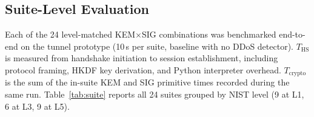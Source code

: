 \subsection{Suite-Level Evaluation}
\label{sec:suite}

Each of the 24 level-matched KEM$\times$SIG combinations was
benchmarked end-to-end on the tunnel prototype (10\,s per suite,
baseline with no DDoS detector).  $T_\text{HS}$ is measured from
handshake initiation to session establishment, including protocol
framing, HKDF key derivation, and Python interpreter overhead.
$T_\text{crypto}$ is the sum of the in-suite KEM and SIG primitive
times recorded during the same run.
Table~\ref{tab:suite} reports all 24 suites grouped by NIST level
(9 at L1, 6 at L3, 9 at L5).

